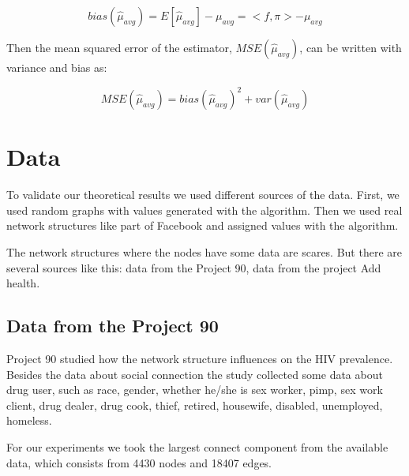 \documentclass[12pt]{report}
\begin{document}
$$bias(\hat{\mu}_{avg}) = E[\hat{\mu}_{avg}] - \mu_{avg} = <f, \pi> - \mu_{avg}$$

Then the mean squared error of the estimator, $MSE(\hat{\mu}_{avg})$, can be written with variance and bias as: 

$$MSE(\hat{\mu}_{avg}) = bias(\hat{\mu}_{avg})^2 + var(\hat{\mu}_{avg})$$

\section{Data}

To validate our theoretical results we used different sources of the data. First, we used random graphs with values generated with the algorithm. 
Then we used real network structures like part of Facebook \cite{Facebook}  and assigned values with the algorithm.

The network structures where the nodes have some data are scares. But there are several sources like this: data from the Project 90\cite{Project90}, data from the project Add health\cite{Addhealth}. 

\subsection{Data from the Project 90}
Project 90 \cite{Project90} studied how the network structure influences on the HIV prevalence. Besides the data about social connection the study collected some data about drug user, such as race, gender, whether he/she is sex worker, pimp, sex work client, drug dealer, drug cook, thief, retired, housewife, disabled, unemployed, homeless.


For our experiments we took the largest connect component from the available data, which consists from 4430 nodes and 18407 edges.
\end{document}
